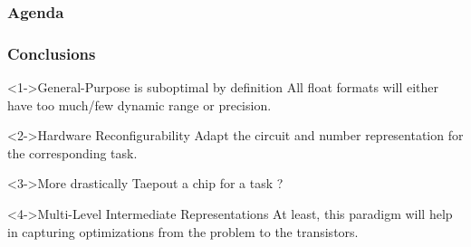 \graphicspath{{./figs/}}

\begin{frame}[plain]
    \frametitle{Agenda}

    \tableofcontents[currentsection, subsectionstyle=show/shaded/hide]

\end{frame}

\begin{frame}
    \frametitle{Conclusions}
    \begin{block}<1->{General-Purpose is suboptimal by definition}
	    All float formats will either have too much/few dynamic range or precision.
    \end{block}
    \begin{block}<2->{Hardware Reconfigurability}
	    Adapt the circuit and number representation for the corresponding task.
    \end{block}
    \begin{block}<3->{More drastically}
	    Taepout a chip for a task ?
    \end{block}
    \begin{block}<4->{Multi-Level Intermediate Representations}
	    At least, this paradigm will help in capturing optimizations from the problem to the transistors.
    \end{block}


\end{frame}


